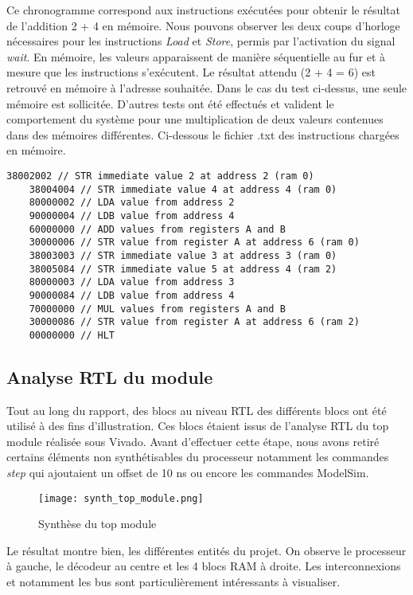 \indent Ce chronogramme correspond aux instructions exécutées pour obtenir le résultat de l'addition 2 + 4 en mémoire.
Nous pouvons observer les deux coups d'horloge nécessaires pour les instructions \textit{Load} et \textit{Store}, permis par l'activation du signal \textit{wait}.
En mémoire, les valeurs apparaissent de manière séquentielle au fur et à mesure que les instructions s'exécutent.
Le résultat attendu (2 + 4 = 6) est retrouvé en mémoire à l'adresse souhaitée.
Dans le cas du test ci-dessus, une seule mémoire est sollicitée. 
D'autres tests ont été effectués et valident le comportement du système pour une multiplication de deux valeurs contenues dans des mémoires différentes.
Ci-dessous le fichier .txt des instructions chargées en mémoire.

\newpage

\begin{lstlisting}[frame=single, basicstyle = \ttfamily \footnotesize]
	38002002 // STR immediate value 2 at address 2 (ram 0)	
	38004004 // STR immediate value 4 at address 4 (ram 0)
	80000002 // LDA value from address 2
	90000004 // LDB value from address 4
	60000000 // ADD values from registers A and B
	30000006 // STR value from register A at address 6 (ram 0)
	38003003 // STR immediate value 3 at address 3 (ram 0)
	38005084 // STR immediate value 5 at address 4 (ram 2)
	80000003 // LDA value from address 3
	90000084 // LDB value from address 4
	70000000 // MUL values from registers A and B
	30000086 // STR value from register A at address 6 (ram 2)
	00000000 // HLT
\end{lstlisting}

\subsection{Analyse RTL du module}

\indent Tout au long du rapport, des blocs au niveau \gls{RTL} des différents blocs ont été utilisé à des fins d'illustration.
Ces blocs étaient issus de l'analyse RTL du top module réalisée sous Vivado.
Avant d'effectuer cette étape, nous avons retiré certains éléments non synthétisables du processeur notamment les commandes \textit{step} qui ajoutaient un offset de 10 ns ou encore les commandes ModelSim.
\begin{figure}[h]
	\centering
	\texttt{[image: synth\_top\_module.png]}
	\caption{Synthèse du top module}
	\label{fig:synth_top_modul}
\end{figure}
Le résultat montre bien, les différentes entités du projet.
On observe le processeur à gauche, le décodeur au centre et les 4 blocs \gls{RAM} à droite.
Les interconnexions et notamment les bus sont particulièrement intéressants à visualiser.

